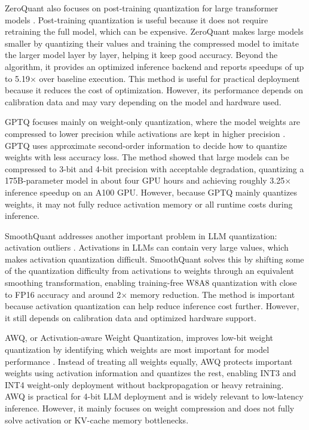 \documentclass[
11pt, %
english, %
singlespacing, %
headsepline, %
]{MastersDoctoralThesis} %
\begin{document}
ZeroQuant also focuses on post-training quantization for large transformer models \cite{yao2022zeroquant}. Post-training quantization is useful because it does not require retraining the full model, which can be expensive. ZeroQuant makes large models smaller by quantizing their values and training the compressed model to imitate the larger model layer by layer, helping it keep good accuracy. Beyond the algorithm, it provides an optimized inference backend and reports speedups of up to 5.19$\times$ over baseline execution. This method is useful for practical deployment because it reduces the cost of optimization. However, its performance depends on calibration data and may vary depending on the model and hardware used.

GPTQ focuses mainly on weight-only quantization, where the model weights are compressed to lower precision while activations are kept in higher precision \cite{frantar2023gptq}. GPTQ uses approximate second-order information to decide how to quantize weights with less accuracy loss. The method showed that large models can be compressed to 3-bit and 4-bit precision with acceptable degradation, quantizing a 175B-parameter model in about four GPU hours and achieving roughly 3.25$\times$ inference speedup on an A100 GPU. However, because GPTQ mainly quantizes weights, it may not fully reduce activation memory or all runtime costs during inference.

SmoothQuant addresses another important problem in LLM quantization: activation outliers \cite{xiao2023smoothquant}. Activations in LLMs can contain very large values, which makes activation quantization difficult. SmoothQuant solves this by shifting some of the quantization difficulty from activations to weights through an equivalent smoothing transformation, enabling training-free W8A8 quantization with close to FP16 accuracy and around 2$\times$ memory reduction. The method is important because activation quantization can help reduce inference cost further. However, it still depends on calibration data and optimized hardware support.

AWQ, or Activation-aware Weight Quantization, improves low-bit weight quantization by identifying which weights are most important for model performance \cite{lin2024awq}. Instead of treating all weights equally, AWQ protects important weights using activation information and quantizes the rest, enabling INT3 and INT4 weight-only deployment without backpropagation or heavy retraining. AWQ is practical for 4-bit LLM deployment and is widely relevant to low-latency inference. However, it mainly focuses on weight compression and does not fully solve activation or KV-cache memory bottlenecks.
\end{document}
